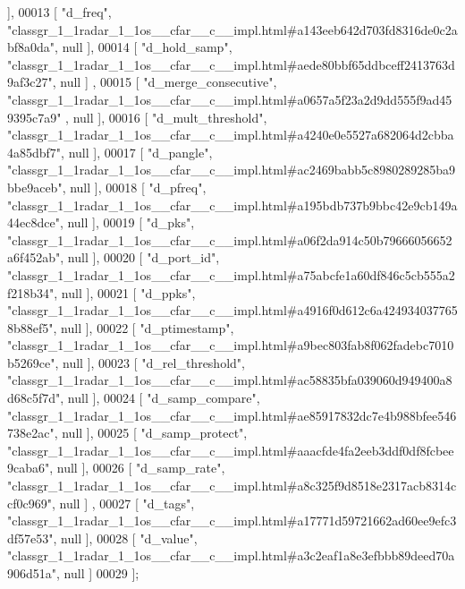 \begin{DoxyCode}
       ],
00013     [ \textcolor{stringliteral}{"d\_freq"}, \textcolor{stringliteral}{"classgr\_1\_1radar\_1\_1os\_\_cfar\_\_c\_\_impl.html#a143eeb642d703fd8316de0c2abf8a0da"}, null ],
00014     [ \textcolor{stringliteral}{"d\_hold\_samp"}, \textcolor{stringliteral}{"classgr\_1\_1radar\_1\_1os\_\_cfar\_\_c\_\_impl.html#aede80bbf65ddbceff2413763d9af3c27"}, null ]
      ,
00015     [ \textcolor{stringliteral}{"d\_merge\_consecutive"}, \textcolor{stringliteral}{"classgr\_1\_1radar\_1\_1os\_\_cfar\_\_c\_\_impl.html#a0657a5f23a2d9dd555f9ad459395c7a9"}
      , null ],
00016     [ \textcolor{stringliteral}{"d\_mult\_threshold"}, \textcolor{stringliteral}{"classgr\_1\_1radar\_1\_1os\_\_cfar\_\_c\_\_impl.html#a4240e0e5527a682064d2cbba4a85dbf7"}, 
      null ],
00017     [ \textcolor{stringliteral}{"d\_pangle"}, \textcolor{stringliteral}{"classgr\_1\_1radar\_1\_1os\_\_cfar\_\_c\_\_impl.html#ac2469babb5c8980289285ba9bbe9aceb"}, null ],
00018     [ \textcolor{stringliteral}{"d\_pfreq"}, \textcolor{stringliteral}{"classgr\_1\_1radar\_1\_1os\_\_cfar\_\_c\_\_impl.html#a195bdb737b9bbc42e9cb149a44ec8dce"}, null ],
00019     [ \textcolor{stringliteral}{"d\_pks"}, \textcolor{stringliteral}{"classgr\_1\_1radar\_1\_1os\_\_cfar\_\_c\_\_impl.html#a06f2da914c50b79666056652a6f452ab"}, null ],
00020     [ \textcolor{stringliteral}{"d\_port\_id"}, \textcolor{stringliteral}{"classgr\_1\_1radar\_1\_1os\_\_cfar\_\_c\_\_impl.html#a75abcfe1a60df846c5cb555a2f218b34"}, null ],
00021     [ \textcolor{stringliteral}{"d\_ppks"}, \textcolor{stringliteral}{"classgr\_1\_1radar\_1\_1os\_\_cfar\_\_c\_\_impl.html#a4916f0d612c6a4249340377658b88ef5"}, null ],
00022     [ \textcolor{stringliteral}{"d\_ptimestamp"}, \textcolor{stringliteral}{"classgr\_1\_1radar\_1\_1os\_\_cfar\_\_c\_\_impl.html#a9bec803fab8f062fadebc7010b5269ce"}, null 
      ],
00023     [ \textcolor{stringliteral}{"d\_rel\_threshold"}, \textcolor{stringliteral}{"classgr\_1\_1radar\_1\_1os\_\_cfar\_\_c\_\_impl.html#ac58835bfa039060d949400a8d68c5f7d"}, 
      null ],
00024     [ \textcolor{stringliteral}{"d\_samp\_compare"}, \textcolor{stringliteral}{"classgr\_1\_1radar\_1\_1os\_\_cfar\_\_c\_\_impl.html#ae85917832dc7e4b988bfee546738e2ac"}, 
      null ],
00025     [ \textcolor{stringliteral}{"d\_samp\_protect"}, \textcolor{stringliteral}{"classgr\_1\_1radar\_1\_1os\_\_cfar\_\_c\_\_impl.html#aaacfde4fa2eeb3ddf0df8fcbee9caba6"}, 
      null ],
00026     [ \textcolor{stringliteral}{"d\_samp\_rate"}, \textcolor{stringliteral}{"classgr\_1\_1radar\_1\_1os\_\_cfar\_\_c\_\_impl.html#a8c325f9d8518e2317acb8314ccf0c969"}, null ]
      ,
00027     [ \textcolor{stringliteral}{"d\_tags"}, \textcolor{stringliteral}{"classgr\_1\_1radar\_1\_1os\_\_cfar\_\_c\_\_impl.html#a17771d59721662ad60ee9efc3df57e53"}, null ],
00028     [ \textcolor{stringliteral}{"d\_value"}, \textcolor{stringliteral}{"classgr\_1\_1radar\_1\_1os\_\_cfar\_\_c\_\_impl.html#a3c2eaf1a8e3efbbb89deed70a906d51a"}, null ]
00029 ];
\end{DoxyCode}
